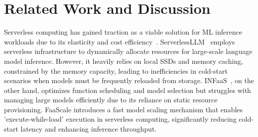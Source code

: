 \section{Related Work and Discussion}
\label{sec:discussion}

Serverless computing has gained traction as a viable solution for ML inference workloads due to its elasticity and cost efficiency~\cite{ali2022optimizing_serverless_inference, yang_infless_2022, ali_batch_nodate, cai2023cost, hong2024optimus, fu_serverlessllm_2024, romero_infaas_nodate, wang_faasnet_nodate}. ServerlessLLM~\cite{fu_serverlessllm_2024} employs serverless infrastructure to dynamically allocate resources for large-scale language model inference. However, it heavily relies on local SSDs and memory caching, constrained by the memory capacity, leading to inefficiencies in cold-start scenarios when models must be frequently reloaded from storage. INFaaS~\cite{romero_infaas_nodate}, on the other hand, optimizes function scheduling and model selection but struggles with managing large models efficiently due to its reliance on static resource provisioning. 
FaaScale introduces a fast model scaling mechanism that enables 'execute-while-load' execution in serverless computing, significantly reducing cold-start latency and enhancing inference throughput.

\fi 


